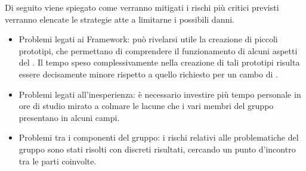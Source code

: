 \label{mRisk2}
Di seguito viene spiegato come verranno mitigati i rischi più critici previsti verranno elencate le strategie atte a limitarne i possibili danni.
\begin{itemize}
\item{Problemi legati ai Framework:} può rivelarsi utile la creazione di piccoli prototipi, che permettano di comprendere il funzionamento di alcuni aspetti del . Il tempo speso complessivamente nella creazione di tali prototipi risulta essere decisamente minore rispetto a quello richiesto per un cambo di .
\item{Problemi legati all'inesperienza:} è necessario investire più tempo personale in ore di studio mirato a colmare le lacune che i vari membri del gruppo presentano in alcuni campi.
\item{Problemi tra i componenti del gruppo:} i rischi relativi alle problematiche del gruppo sono stati risolti con discreti risultati, cercando un punto d'incontro tra le parti coinvolte.
\end{itemize}
